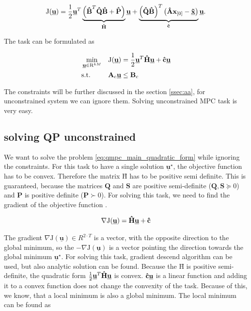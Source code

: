 \documentclass{article}
\begin{document}
\begin{equation}
\mathrm{J}(\underline{\textbf{u}}) = \frac{1}{2}\textbf{\underline{u}}^T\underbrace{\left(\textbf{\^B}^T\textbf{\^Q}\textbf{\^B} + \textbf{\^P}\right)}_{\textbf{\^H}}\textbf{\underline{u}} + \underbrace{\left(\textbf{\^Q}\textbf{\^B}\right)^T\left(\textbf{\^A}\textbf{x}_{[0]} - \textbf{\underline{\~x}}\right)}_{\textbf{\^c}}\textbf{\underline{u}}.
\label{eq:mpc_objective_large}
\end{equation}

The task can be formulated as

\begin{equation}
\label{eq:qmpc_main_quadratic_form}
\begin{aligned}
& \min_{\textbf{\underline{u}} \in \mathrm{R}^{kM}}
& & \mathrm{J}(\underline{\textbf{u}}) = \frac{1}{2}\textbf{\underline{u}}^T\textbf{\^H}\textbf{\underline{u}} + \textbf{\^c} \textbf{\underline{u}}\\
& \text{s.t.}
& & \textbf{A}_c \textbf{\underline{u}} \leq \textbf{B}_c
\end{aligned}
\end{equation}

The constraints will be further discussed in the section \ref{ssec:aa}, for unconstrained system we can ignore them. Solving unconstrained MPC task is very easy.

\subsection{solving QP unconstrained}
We want to solve the problem \ref{eq:qmpc_main_quadratic_form} while ignoring the constraints. For this task to have a single solution $\underline{\textbf{u}}^{\star}$, the objective function has to be convex. Therefore the matrix $\textbf{\^H}$ has to be positive semi definite. This is guaranteed, because the matrices  $\textbf{Q}$ and $\textbf{S}$ are positive semi-definite ($\textbf{Q}, \textbf{S} \succeq 0$) and $\textbf{P}$ is positive definite ($\textbf{P} \succ 0$). For solving this task, we need to find the gradient of the objective function \cite{zometa2012implementation}. 

\begin{equation}
\label{eq:J_grad}
\nabla\mathrm{J}(\underline{\textbf{u}}) = \textbf{\^H}\textbf{\underline{u}} + \textbf{\^c}
\end{equation}

The gradient $\nabla\mathrm{J}(\underline{\textbf{u}}) \in R^{2 \cdot T}$ is a vector, with the opposite direction to the global minimum, so the $-\nabla\mathrm{J}(\underline{\textbf{u}})$ is a vector pointing the direction towards the global minimum $\underline{\textbf{u}}^{\star}$. For solving this task, gradient descend algorithm can be used, but also analytic solution can be found.  
Because the  $\textbf{\^H}$ is positive semi-definite, the quadratic form $\frac{1}{2}\textbf{\underline{u}}^T\textbf{\^H}\textbf{\underline{u}}$ is convex. $\textbf{\^c} \textbf{\underline{u}}$ is a linear function and adding it to a convex function does not change the convexity of the task. Because of this, we know, that a local minimum is also a global minimum. The local minimum can be found as 
\end{document}
